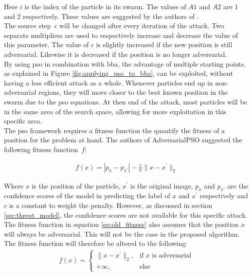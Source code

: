 Here $i$ is the index of the particle in its swarm. The values of $A1$ and $A2$ are 1 and 2 respectively. These values are suggested by the authors of \cite{suryanto2020}.\\

The source step~$\epsilon$ will be changed after every iteration of the attack. Two separate multipliers are used to respectively increase and decrease the value of this parameter. The value of $\epsilon$ is slightly increased if the new position is still adversarial. Likewise it is decreased if the position is no longer adversarial.\\

By using \gls{pso} in combination with \gls{bba}, the advantage of multiple starting points, as explained in Figure \ref{fig:applying_pso_to_bba}, can be exploited, without having a less efficient attack as a whole. Whenever particles end up in non-adversarial regions, they will move closer to the best known position in the swarm due to the \gls{pso} equations. At then end of the attack, most particles will be in the same area of the search space, allowing for more exploitation in this specific area.\\

The \gls{pso} framework requires a fitness function the quantify the fitness of a position for the problem at hand. The authors of AdversarialPSO \cite{mosli2019they} suggested the following fitness function~$f$:

\begin{align}
	f(x) = |p_{x} - p_{x^{\prime}}| - \frac{c}{n}\|x-x^\prime\|_2   \label{eq:old_fitness}
\end{align}

Where $x$ is the position of the particle, $x^\prime$ is the original image, $p_{x}$ and $p_{x^\prime}$ are the confidence scores of the model in predicting the label of $x$ and $x^\prime$ respectively and $c$ is a constant to weight the penalty. However, as discussed in section \ref{sec:threat_model}, the confidence scores are not available for this specific attack. The fitness function in equation \ref{eq:old_fitness} also assumes that the position $x$ will always be adversarial. This will not be the case in the proposed algorithm. The fitness function will therefore be altered to the following:
\begin{align}
	f(x) = 
	\begin{cases}
 		\| x - x^\prime\|_2,	&\text{if } x \text{ is adversarial}\\
 		+\infty, 		& \text{else}
	\end{cases}
\end{align}

